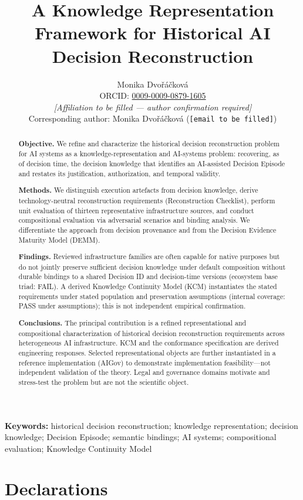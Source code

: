 \documentclass[11pt,a4paper]{article}
\title{A Knowledge Representation Framework for Historical AI Decision Reconstruction}
\author{Monika Dvo\v{r}\'{a}\v{c}kov\'{a}\\
ORCID: \href{https://orcid.org/0009-0009-0879-1605}{0009-0009-0879-1605}\\
\textit{[Affiliation to be filled --- author confirmation required]}\\
Corresponding author: Monika Dvo\v{r}\'{a}\v{c}kov\'{a} (\texttt{[email to be filled]})}
\date{}
\begin{document}
\maketitle

\begin{abstract}
\textbf{Objective.}
We refine and characterize the historical decision reconstruction problem for AI systems as a knowledge-representation and AI-systems problem: recovering, as of decision time, the decision knowledge that identifies an AI-assisted Decision Episode and restates its justification, authorization, and temporal validity.

\textbf{Methods.}
We distinguish execution artefacts from decision knowledge, derive technology-neutral reconstruction requirements (Reconstruction Checklist), perform unit evaluation of thirteen representative infrastructure sources, and conduct compositional evaluation via adversarial scenarios and binding analysis. We differentiate the approach from decision provenance and from the Decision Evidence Maturity Model (DEMM).

\textbf{Findings.}
Reviewed infrastructure families are often capable for native purposes but do not jointly preserve sufficient decision knowledge under default composition without durable bindings to a shared Decision ID and decision-time versions (ecosystem base triad: FAIL). A derived Knowledge Continuity Model (KCM) instantiates the stated requirements under stated population and preservation assumptions (internal coverage: PASS under assumptions); this is not independent empirical confirmation.

\textbf{Conclusions.}
The principal contribution is a refined representational and compositional characterization of historical decision reconstruction requirements across heterogeneous AI infrastructure. KCM and the conformance specification are derived engineering responses. Selected representational objects are further instantiated in a reference implementation (AIGov) to demonstrate implementation feasibility---not independent validation of the theory. Legal and governance domains motivate and stress-test the problem but are not the scientific object.
\end{abstract}

\noindent\textbf{Keywords:} historical decision reconstruction; knowledge representation; decision knowledge; Decision Episode; semantic bindings; AI systems; compositional evaluation; Knowledge Continuity Model


\section*{Declarations}
\end{document}
